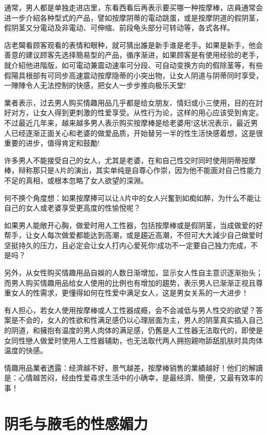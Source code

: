 \documentclass[12pt,UTF8]{ctexbook}
\begin{document}
通常，男人都是单独走进店里，东看西看后再表示要买哪一种按摩棒，店員通常会进一步介紹各种型式的产品，譬如按摩阴蒂的電动跳蛋，或是按摩阴道的假阴茎，假阴茎又分電动及非電动、可伸缩、前段龟头部分可转动等，各式各样。

店老閪看顾客观看的表情和眼种，就可猜出誰是新手谁是老手。如果是新手，他会善意的建议顾客先选择簡易型的产品，循序渐进，如果顾客是有使用经验的老手，就介紹他进階版，如可電动兼震动速率可分段、可自动变换方向的假除茎等，有些假陽具根部有可同步高速震动按摩隐蒂的小突出物，让女人阴道与阴蒂同时享受，一陣陣令人无法控制的快感，把女人一步步推向极乐天堂!

業者表示，过去男人购买情趣用品几乎都是给女朋友、情妇或小三使用，目的在討好对方，让女人得到更刺激的性爱享受。从性行为论，这样的用心应该受到肯定。不过最近几年来，越来越多男人表示购买按摩棒是给老婆用!这状况表示，最近男人已经逐渐正面关心和老婆的做爱品质，开始替另一半的性生活快感着想，这是很重要的进步，值得肯定和鼓勵!

许多男人不能接受自己的女人，尤其是老婆，在和自己性交时同时使用阴蒂按摩棒，辩称那只是A片的演出，其实单纯是自尊心作崇，因为他不能面对自己性能力不足的真相，或根本忽略了女人欲望的深淵。

何不换个角度想：如果按摩捧可以让A片中的女人兴奮到如痴如醉，为什么不能让自己的女人或老婆享受更高度的性愉悅呢？

如果男人能敞开心胸，做爱时用人工性器，包括按摩棒或是假阴茎，当成做爱的好帮手，让女人每次做爱都能达到高潮，或是趨近高潮，不但可大大減少自己做爱时坚挺持久的压力，且必定会让女人打内心爱死你!成功不一定要自己独力完成，不是吗？

另外，从女性购买情趣用品自娛的人数日渐增加，显示女人性自主意识逐渐抬头；而男人购买情趣用品给女人使用的比例也有增加的趨势，表示男人已渐渐正视且尊重女人的性需求，更懂得如何在性爱中满足女人，这是男女关系的一大进步！

有人担心，若女人使用按摩棒或人工性器成瘾，会不会减低与男人性交的欲望？答案是不会的，女人的性欲和性满足感仍以心理层面为主，男人的阴茎真实插入自己的阴道，和擁抱有温度的男人肉体的满足感，仍舊是人工性器无法取代的，即使是女同性戀人做爱时使用人工性器辅助，也无法取代两人拥抱親吻舔舐肌肤时具肉体温度的快感。

情趣用品業者透露：经濟越不好，景气越差，按摩棒销售的業績越好！他们的解讀是：心情越苦闷，经由性爱尋求生活中的小确幸，是最经濟、簡便，又最有效率的事！

\chapter{阴毛与腋毛的性感媚力}
\end{document}
